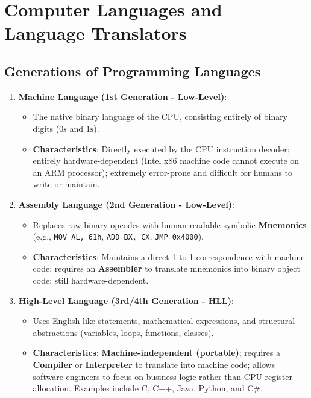 \section{Computer Languages and Language Translators}

\subsection{Generations of Programming Languages}

\begin{enumerate}[leftmargin=1.5em]
    \item \textbf{Machine Language (1st Generation - Low-Level)}:
    \begin{itemize}
        \item The native binary language of the CPU, consisting entirely of binary digits ($0\text{s}$ and $1\text{s}$).
        \item \textbf{Characteristics}: Directly executed by the CPU instruction decoder; entirely hardware-dependent (Intel x86 machine code cannot execute on an ARM processor); extremely error-prone and difficult for humans to write or maintain.
    \end{itemize}

    \item \textbf{Assembly Language (2nd Generation - Low-Level)}:
    \begin{itemize}
        \item Replaces raw binary opcodes with human-readable symbolic \textbf{Mnemonics} (e.g., \texttt{MOV AL, 61h}, \texttt{ADD BX, CX}, \texttt{JMP 0x4000}).
        \item \textbf{Characteristics}: Maintains a direct 1-to-1 correspondence with machine code; requires an \textbf{Assembler} to translate mnemonics into binary object code; still hardware-dependent.
    \end{itemize}

    \item \textbf{High-Level Language (3rd/4th Generation - HLL)}:
    \begin{itemize}
        \item Uses English-like statements, mathematical expressions, and structural abstractions (variables, loops, functions, classes).
        \item \textbf{Characteristics}: \textbf{Machine-independent (portable)}; requires a \textbf{Compiler} or \textbf{Interpreter} to translate into machine code; allows software engineers to focus on business logic rather than CPU register allocation. Examples include C, C++, Java, Python, and C\#.
    \end{itemize}
\end{enumerate}

